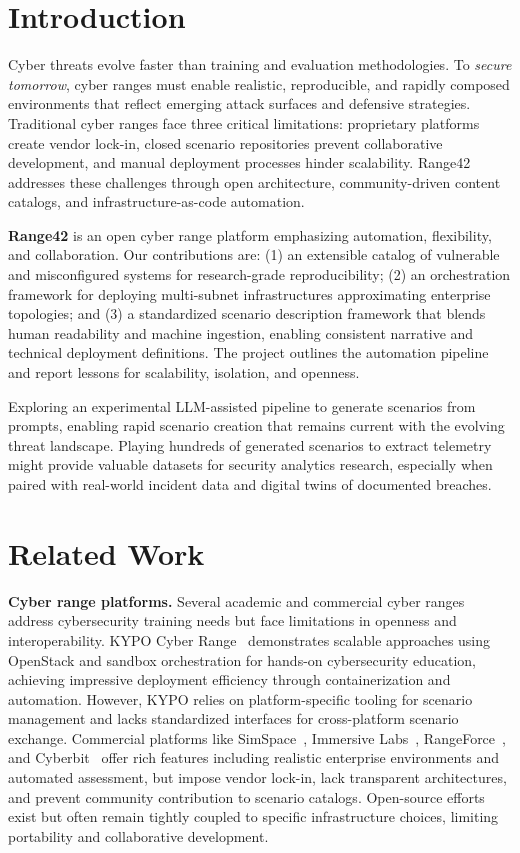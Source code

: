 \documentclass[11pt]{article}
\begin{document}
\section{Introduction}
Cyber threats evolve faster than training and evaluation methodologies. To \emph{secure tomorrow}, cyber ranges must enable realistic, reproducible, and rapidly composed environments that reflect emerging attack surfaces and defensive strategies. Traditional cyber ranges face three critical limitations: proprietary platforms create vendor lock-in, closed scenario repositories prevent collaborative development, and manual deployment processes hinder scalability. Range42 addresses these challenges through open architecture, community-driven content catalogs, and infrastructure-as-code automation.

\textbf{Range42} is an open cyber range platform emphasizing automation, flexibility, and collaboration. Our contributions are: (1) an extensible catalog of vulnerable and misconfigured systems for research-grade reproducibility; (2) an orchestration framework for deploying multi-subnet infrastructures approximating enterprise topologies; and (3) a standardized scenario description framework that blends human readability and machine ingestion, enabling consistent narrative and technical deployment definitions. The project outlines the automation pipeline and report lessons for scalability, isolation, and openness.

Exploring an experimental LLM-assisted pipeline to generate scenarios from prompts, enabling rapid scenario creation that remains current with the evolving threat landscape. Playing hundreds of generated scenarios to extract telemetry might provide valuable datasets for security analytics research, especially when paired with real-world incident data and digital twins of documented breaches.

\section{Related Work}

\textbf{Cyber range platforms.}
Several academic and commercial cyber ranges address cybersecurity training needs but face limitations in openness and interoperability.
KYPO Cyber Range~\cite{kypo2021} demonstrates scalable approaches using OpenStack and sandbox orchestration for hands-on cybersecurity education, achieving impressive deployment efficiency through containerization and automation. However, KYPO relies on platform-specific tooling for scenario management and lacks standardized interfaces for cross-platform scenario exchange.
Commercial platforms like SimSpace~\cite{simspace}, Immersive Labs~\cite{immersive}, RangeForce~\cite{rangeforce}, and Cyberbit~\cite{cyberbit} offer rich features including realistic enterprise environments and automated assessment, but impose vendor lock-in, lack transparent architectures, and prevent community contribution to scenario catalogs.
Open-source efforts exist but often remain tightly coupled to specific infrastructure choices, limiting portability and collaborative development.
\end{document}

